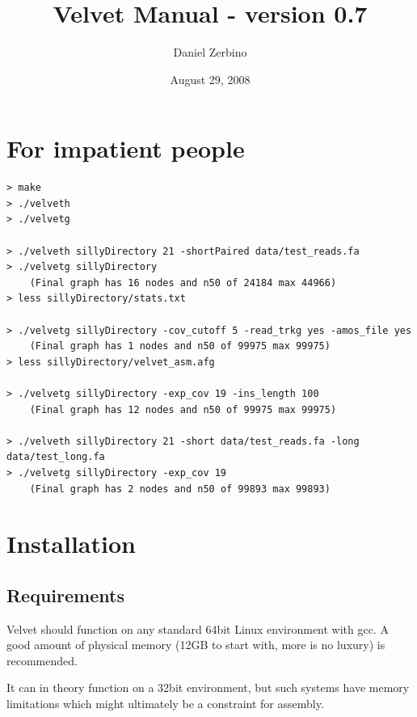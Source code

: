 \documentclass{article}
\begin{document}
\title{Velvet Manual - version 0.7}
\author{Daniel Zerbino}
\date{August 29, 2008}


\maketitle

\tableofcontents

\newpage

\section{For impatient people}

\begin{verbatim}
> make
> ./velveth
> ./velvetg

> ./velveth sillyDirectory 21 -shortPaired data/test_reads.fa
> ./velvetg sillyDirectory
	(Final graph has 16 nodes and n50 of 24184 max 44966)
> less sillyDirectory/stats.txt

> ./velvetg sillyDirectory -cov_cutoff 5 -read_trkg yes -amos_file yes
	(Final graph has 1 nodes and n50 of 99975 max 99975)
> less sillyDirectory/velvet_asm.afg

> ./velvetg sillyDirectory -exp_cov 19 -ins_length 100
	(Final graph has 12 nodes and n50 of 99975 max 99975)

> ./velveth sillyDirectory 21 -short data/test_reads.fa -long data/test_long.fa
> ./velvetg sillyDirectory -exp_cov 19
	(Final graph has 2 nodes and n50 of 99893 max 99893)

\end{verbatim}

\section{Installation}

\subsection{Requirements}

	Velvet should function on any standard 64bit Linux environment with
gcc. A good amount of physical memory (12GB to start with, more is no luxury)
is recommended. 
	
	It can in theory function on a 32bit environment, but such systems have memory limitations which might ultimately be a constraint for assembly.
\end{document}
